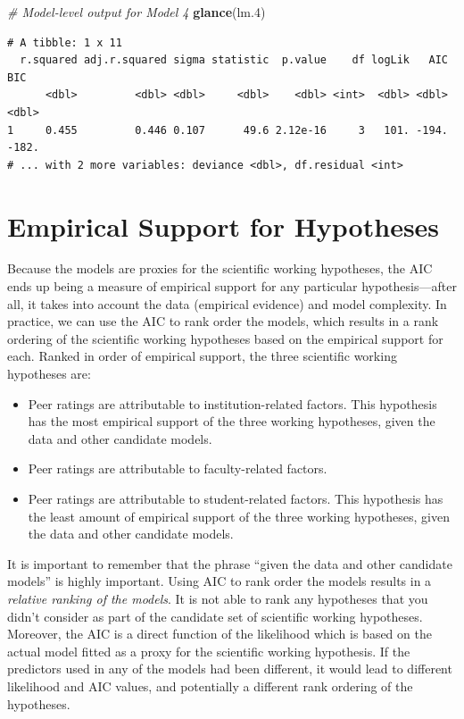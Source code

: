 \documentclass[]{book}
\newenvironment{Shaded}{\begin{snugshade}}{\end{snugshade}}
\newcommand{\CommentTok}[1]{\textcolor[rgb]{0.56,0.35,0.01}{\textit{#1}}}
\newcommand{\FloatTok}[1]{\textcolor[rgb]{0.00,0.00,0.81}{#1}}
\newcommand{\KeywordTok}[1]{\textcolor[rgb]{0.13,0.29,0.53}{\textbf{#1}}}
\newcommand{\NormalTok}[1]{#1}
\providecommand{\tightlist}{%
  \setlength{\itemsep}{0pt}\setlength{\parskip}{0pt}}
\begin{document}
\begin{Shaded}
\begin{Highlighting}[]
\CommentTok{# Model-level output for Model 4}
\KeywordTok{glance}\NormalTok{(lm}\FloatTok{.4}\NormalTok{)}
\end{Highlighting}
\end{Shaded}

\begin{verbatim}
# A tibble: 1 x 11
  r.squared adj.r.squared sigma statistic  p.value    df logLik   AIC   BIC
      <dbl>         <dbl> <dbl>     <dbl>    <dbl> <int>  <dbl> <dbl> <dbl>
1     0.455         0.446 0.107      49.6 2.12e-16     3   101. -194. -182.
# ... with 2 more variables: deviance <dbl>, df.residual <int>
\end{verbatim}

\hypertarget{empirical-support-for-hypotheses}{%
\section{Empirical Support for Hypotheses}\label{empirical-support-for-hypotheses}}

Because the models are proxies for the scientific working hypotheses, the AIC ends up being a measure of empirical support for any particular hypothesis---after all, it takes into account the data (empirical evidence) and model complexity. In practice, we can use the AIC to rank order the models, which results in a rank ordering of the scientific working hypotheses based on the empirical support for each. Ranked in order of empirical support, the three scientific working hypotheses are:

\begin{itemize}
\tightlist
\item
  Peer ratings are attributable to institution-related factors. This hypothesis has the most empirical support of the three working hypotheses, given the data and other candidate models.
\item
  Peer ratings are attributable to faculty-related factors.
\item
  Peer ratings are attributable to student-related factors. This hypothesis has the least amount of empirical support of the three working hypotheses, given the data and other candidate models.
\end{itemize}

It is important to remember that the phrase ``given the data and other candidate models'' is highly important. Using AIC to rank order the models results in a \emph{relative ranking of the models}. It is not able to rank any hypotheses that you didn't consider as part of the candidate set of scientific working hypotheses. Moreover, the AIC is a direct function of the likelihood which is based on the actual model fitted as a proxy for the scientific working hypothesis. If the predictors used in any of the models had been different, it would lead to different likelihood and AIC values, and potentially a different rank ordering of the hypotheses.
\end{document}
